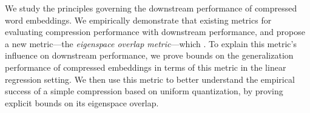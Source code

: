 We study the principles governing the downstream performance of compressed word embeddings.
We empirically demonstrate that existing metrics for evaluating compression performance  with downstream performance, and propose a new metric---the \textit{eigenspace overlap metric}---which .
To explain this metric's influence on downstream performance, we prove bounds on the generalization performance of compressed embeddings in terms of this metric in the linear regression setting.
We then use this metric to better understand the empirical success of a simple compression based on uniform quantization, by proving explicit bounds on its eigenspace overlap.



%
%
%
%
%
%
%

